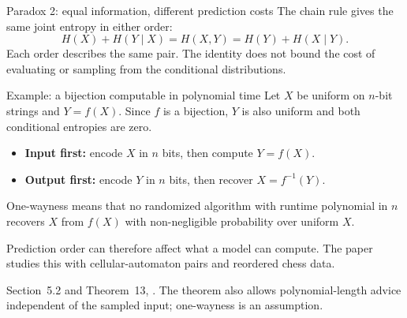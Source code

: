 \documentclass[aspectratio=169,notheorems]{beamer}
\theoremstyle{definition}
\newcommand{\src}[1]{{\scriptsize\color{black!60}#1\par}}
\begin{document}
\begin{frame}{Paradox 2: equal information, different prediction costs}
\small
The chain rule gives the same joint entropy in either order:
\[
H(X)+H(Y\mid X)=H(X,Y)=H(Y)+H(X\mid Y).
\]
Each order describes the same pair. The identity does not bound the cost of evaluating or sampling from the conditional distributions.

\begin{block}{Example: a bijection computable in polynomial time}
Let $X$ be uniform on $n$-bit strings and $Y=f(X)$. Since $f$ is a bijection, $Y$ is also uniform and both conditional entropies are zero.
\begin{itemize}\setlength{\itemsep}{0.4em}
\item \textbf{Input first:} encode $X$ in $n$ bits, then compute $Y=f(X)$.
\item \textbf{Output first:} encode $Y$ in $n$ bits, then recover $X=f^{-1}(Y)$.
\end{itemize}
One-wayness means that no randomized algorithm with runtime polynomial in $n$ recovers $X$ from $f(X)$ with non-negligible probability over uniform $X$.
\end{block}
Prediction order can therefore affect what a model can compute. The paper studies this with cellular-automaton pairs and reordered chess data.

\smallskip
\src{Section~5.2 and Theorem~13, \citet{finzi2026}. The theorem also allows polynomial-length advice independent of the sampled input; one-wayness is an assumption.}
\end{frame}
\end{document}
